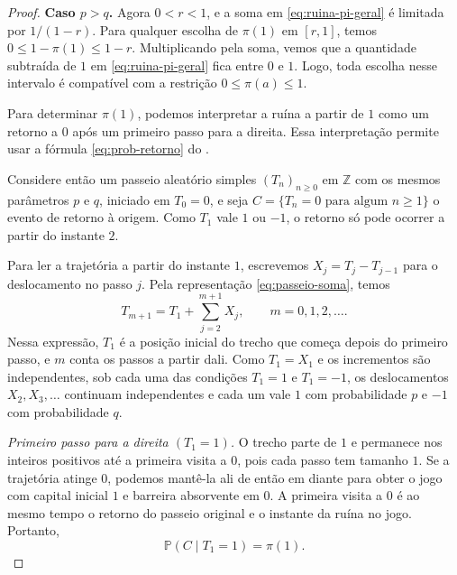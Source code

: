 \documentclass[12pt,portuguese]{article}
\theoremstyle{definition}
\theoremstyle{plainexercise}
\theoremstyle{starredexercise}
\theoremstyle{definition}
\begin{document}
\begin{proof}
  \smallskip
  \noindent\textbf{Caso $p > q$.}
  Agora $0 < r < 1$, e a soma em \eqref{eq:ruina-pi-geral} é limitada por
  $1/(1 - r)$. Para qualquer escolha de $\pi(1)$ em $[r, 1]$, temos
  $0 \leqslant 1 - \pi(1) \leqslant 1 - r$. Multiplicando pela soma,
  vemos que a quantidade subtraída de $1$ em \eqref{eq:ruina-pi-geral} fica
  entre $0$ e $1$. Logo, toda escolha nesse intervalo é compatível com a
  restrição $0 \leqslant \pi(a) \leqslant 1$.

  Para determinar $\pi(1)$, podemos interpretar a ruína a partir de $1$
  como um retorno a $0$ após um primeiro passo para a direita. Essa
  interpretação permite usar a fórmula \eqref{eq:prob-retorno} do
  .

  Considere então um passeio aleatório simples $(T_n)_{n \geqslant 0}$ em
  $\mathbb{Z}$ com os mesmos parâmetros $p$ e $q$, iniciado em $T_0 = 0$, e
  seja $C = \{T_n = 0 \text{ para algum } n \geqslant 1\}$ o evento de
  retorno à origem. Como $T_1$ vale $1$ ou $-1$, o retorno só pode ocorrer
  a partir do instante $2$.

  Para ler a trajetória a partir do instante $1$, escrevemos
  $X_j = T_j - T_{j-1}$ para o deslocamento no passo $j$. Pela representação
  \eqref{eq:passeio-soma}, temos
  \[
    T_{m+1} = T_1 + \sum_{j=2}^{m+1} X_j, \qquad m = 0, 1, 2, \ldots.
  \]
  Nessa expressão, $T_1$ é a posição inicial do trecho que começa depois do
  primeiro passo, e $m$ conta os passos a partir dali. Como $T_1 = X_1$ e os
  incrementos são independentes, sob cada uma das condições $T_1 = 1$ e
  $T_1 = -1$, os deslocamentos $X_2, X_3, \ldots$ continuam independentes e
  cada um vale $1$ com probabilidade $p$ e $-1$ com probabilidade $q$.

  \smallskip
  \noindent\textit{Primeiro passo para a direita $(T_1 = 1)$.}
  O trecho parte de $1$ e permanece nos inteiros positivos até a primeira
  visita a $0$, pois cada passo tem tamanho $1$. Se a trajetória atinge $0$,
  podemos mantê-la ali de então em diante para obter o jogo com capital
  inicial $1$ e barreira absorvente em $0$. A primeira visita a $0$ é ao
  mesmo tempo o retorno do passeio original e o instante da ruína no jogo.
  Portanto,
  \[
    \mathbb{P}(C \mid T_1 = 1) = \pi(1).
  \]


\end{proof}
\end{document}
